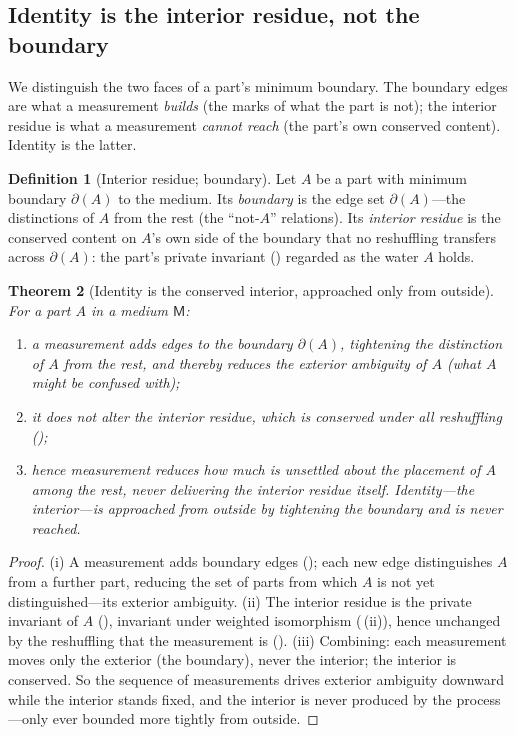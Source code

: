 \documentclass[11pt,a4paper]{article}
\theoremstyle{thmstyle}
\newtheorem{theorem}{Theorem}[section]
\theoremstyle{definition}
\newtheorem{definition}[theorem]{Definition}
\theoremstyle{remark}
\newcommand{\cut}{\partial}               %
\newcommand{\med}{\mathsf{M}}             %
\begin{document}
\subsection{Identity is the interior residue, not the boundary}

We distinguish the two faces of a part's minimum boundary. The boundary edges are
what a measurement \emph{builds} (the marks of what the part is not); the interior
residue is what a measurement \emph{cannot reach} (the part's own conserved
content). Identity is the latter.

\begin{definition}[Interior residue; boundary]
\label{def:interior}
Let $A$ be a part with minimum boundary $\cut(A)$ to the medium. Its
\emph{boundary} is the edge set $\cut(A)$---the distinctions of $A$ from the rest
\textup{(}the ``not-$A$'' relations\textup{)}. Its \emph{interior residue} is the
conserved content on $A$'s own side of the boundary that no reshuffling
transfers across $\cut(A)$: the part's private invariant
\textup{(}\textup{)} regarded as the water $A$ holds.
\end{definition}

\begin{theorem}[Identity is the conserved interior, approached only from outside]
\label{thm:identity-interior}
For a part $A$ in a medium $\med$:
\begin{enumerate}[label=\textup{(\roman*)},leftmargin=2.2em]
\item a measurement adds edges to the boundary $\cut(A)$, tightening the
distinction of $A$ from the rest, and thereby reduces the \emph{exterior}
ambiguity of $A$ \textup{(}what $A$ might be confused with\textup{)};
\item it does not alter the interior residue, which is conserved under all
reshuffling \textup{(}\textup{)};
\item hence measurement reduces how much is unsettled \emph{about the placement of
$A$ among the rest}, never delivering the interior residue itself. Identity---the
interior---is approached from outside by tightening the boundary and is never
reached.
\end{enumerate}
\end{theorem}

\begin{proof}
(i) A measurement adds boundary edges (); each new edge
distinguishes $A$ from a further part, reducing the set of parts from which $A$ is
not yet distinguished---its exterior ambiguity. (ii) The interior residue is the
private invariant of $A$ (), invariant under
weighted isomorphism (\,(ii)), hence unchanged by the reshuffling
that the measurement is (). (iii) Combining: each
measurement moves only the exterior (the boundary), never the interior; the
interior is conserved. So the sequence of measurements drives exterior ambiguity
downward while the interior stands fixed, and the interior is never produced by
the process---only ever bounded more tightly from outside.
\end{proof}
\end{document}
